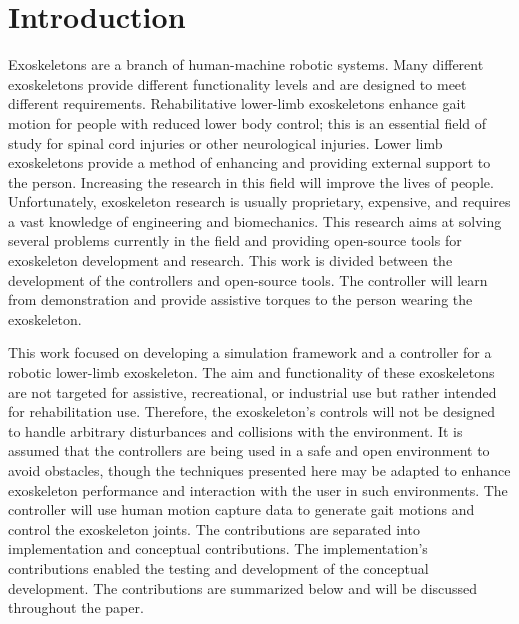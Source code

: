 \chapter{Introduction}

Exoskeletons are a branch of human-machine robotic systems. Many different exoskeletons provide different functionality levels and are designed to meet different requirements. Rehabilitative lower-limb exoskeletons enhance gait motion for people with reduced lower body control; this is an essential field of study for spinal cord injuries or other neurological injuries. Lower limb exoskeletons provide a method of enhancing and providing external support to the person. Increasing the research in this field will improve the lives of people. Unfortunately, exoskeleton research is usually proprietary, expensive, and requires a vast knowledge of engineering and biomechanics. This research aims at solving several problems currently in the field and providing open-source tools for exoskeleton development and research. This work is divided between the development of the controllers and open-source tools. The controller will learn from demonstration and provide assistive torques to the person wearing the exoskeleton.


This work focused on developing a simulation framework and a controller for a robotic lower-limb exoskeleton. The aim and functionality of these exoskeletons are not targeted for assistive, recreational, or industrial use but rather intended for rehabilitation use. Therefore, the exoskeleton's controls will not be designed to handle arbitrary disturbances and collisions with the environment. It is assumed that the controllers are being used in a safe and open environment to avoid obstacles, though the techniques presented here may be adapted to enhance exoskeleton performance and interaction with the user in such environments. The controller will use human motion capture data to generate gait motions and control the exoskeleton joints. The contributions are separated into implementation and conceptual contributions. The implementation's contributions enabled the testing and development of the conceptual development. The contributions are summarized below and will be discussed throughout the paper. 

